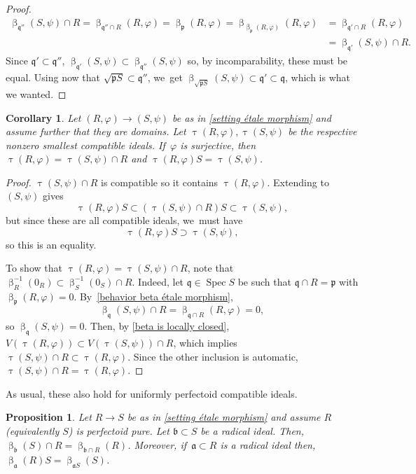 \documentclass[JEP,XML,SOM,Unicode,published]{cedram}
\let\autoref\cref
\theoremstyle{plain}
\newtheorem{corollary}[theorem]{Corollary}
\newtheorem{proposition}[theorem]{Proposition}
\theoremstyle{definition}
\numberwithin{equation}{theorem}
\newcommand{\fra}{\mathfrak{a}}
\newcommand{\frab}{\mathfrak{b}}
\newcommand{\p}{\mathfrak{p}}
\newcommand{\q}{\mathfrak{q}}
\DeclareMathOperator{\Spec}{{Spec}}
\renewcommand{\phi}{\varphi}
\newcommand{\rphi}{(R,\phi)}
\newcommand{\spsi}{(S,\psi)}
\newcommand{\pS}{\p S}
\newcommand{\inv}{^{-1}}
\begin{document}
\begin{proof}
\begin{align*}
\upbeta_{\q''}\spsi\cap R=\upbeta_{\q''\cap R}\rphi=\upbeta_\p\rphi=\upbeta_{\upbeta_\p\rphi}\rphi&=\upbeta_{\q'\cap R}\rphi\\
&=\upbeta_{\q'}\spsi\cap R.
\end{align*}
Since $\q'\subset \q''$, $\upbeta_{\q'}\spsi\subset\upbeta_{\q''}\spsi$ so, by incomparability, these must be equal.
Using now that $\sqrt{\pS}\subset \q''$, we~get $\upbeta_{\sqrt{\pS}}\spsi\subset \q'\subset \q$, which is what we wanted.
\end{proof}

\begin{corollary}\label{test ideal of pairs under étale morphisms}
Let $\rphi\to\spsi$ be as in \autoref{setting étale morphism} and assume further that they are domains. Let $\uptau\rphi, \uptau\spsi$ be the respective nonzero smallest compatible ideals. If~$\phi$ is surjective, then $\uptau\rphi=\uptau\spsi\cap R$ and $\uptau\rphi S=\uptau\spsi$.
\end{corollary}

\begin{proof}
$\uptau\spsi\cap R$ is compatible so it contains $\uptau\rphi$. Extending to $\spsi$ gives
\[
\uptau\rphi S\subset (\uptau\spsi\cap R) S \subset \uptau\spsi,
\]
but since these are all compatible ideals, we~must have
\[
\uptau\rphi S\supset \uptau\spsi,
\]
so this is an equality.

To show that $\uptau\rphi=\uptau\spsi\cap R$, note that $\upbeta_R\inv(0_R)\subset \upbeta_S\inv(0_S)\cap R$. Indeed, let $\q\in \Spec S$ be such that $\q\cap R= \p $ with $\upbeta_\p\rphi=0$. By~\autoref{behavior beta étale morphism},\vspace*{-3pt}
\[
\upbeta_\q\spsi\cap R=\upbeta_{\q\cap R}\rphi=0,
\]
so $\upbeta_\q\spsi=0$.
Then, by \autoref{beta is locally closed}, $V(\uptau\rphi)\subset V(\uptau\spsi)\cap R$, which implies $\uptau\spsi\cap R \subset \uptau\rphi$. Since the other inclusion is automatic, $\uptau\spsi\cap R = \uptau\rphi$.
\end{proof}

As usual, these also hold for uniformly perfectoid compatible ideals.
\begin{proposition}
Let $R\to S$ be as in \autoref{setting étale morphism} and assume $R$ (equivalently $S$) is perfectoid pure. Let $\frab\subset S$ be a radical ideal. Then, $\upbeta_\frab(S)\cap R=\upbeta_{\frab\cap R}(R)$. Moreover, if~$\fra\subset R$ is a radical ideal then, $\upbeta_\fra(R)S=\upbeta_{\fra S}(S)$.
\end{proposition}
\end{document}
